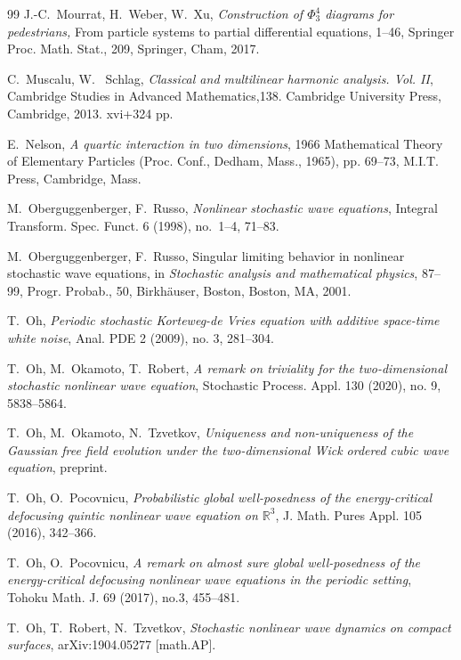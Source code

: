 \documentclass[%
11pt,  reqno]{amsart}
\newcommand{\1}{\hspace{0.2mm}\text{I}\hspace{0.2mm}}
\newcommand{\R}{\mathbb{R}}
\numberwithin{equation}{section}
\numberwithin{theorem}{section}
\begin{document}
\begin{thebibliography}{99}
J.-C.~Mourrat, H.~Weber, W.~Xu,
{\it Construction of $\Phi^4_3$ diagrams for pedestrians,}
 From particle systems to partial differential equations, 1--46, Springer Proc. Math. Stat., 209, Springer, Cham, 2017.

C.~Muscalu, W.~ Schlag,
 {\it Classical and multilinear harmonic analysis. {V}ol. {II}},
 Cambridge Studies in Advanced Mathematics,138. Cambridge University Press, Cambridge, 2013. 
xvi+324 pp. 


E.~Nelson, 
{\it A quartic interaction in two dimensions}, 
 1966 Mathematical Theory of Elementary Particles (Proc. Conf., Dedham, Mass., 1965), pp. 69--73, M.I.T. Press, Cambridge, Mass.






M.~Oberguggenberger, F.~Russo, 
{\it Nonlinear stochastic wave equations}, Integral Transform. Spec. Funct.  6 (1998), no.~1--4, 71--83. 


M.~Oberguggenberger, F.~Russo, Singular limiting behavior in nonlinear stochastic wave equations, in {\it Stochastic analysis and mathematical physics}, 87--99, Progr. Probab., 50, Birkh\"auser, Boston, 
 Boston, MA, 2001.




T.~Oh, {\it Periodic stochastic Korteweg-de Vries equation with additive space-time white noise}, Anal. PDE 2 (2009), no. 3, 281--304. 


T.~Oh, M.~Okamoto, T.~Robert,
 {\it A remark on triviality for the two-dimensional stochastic nonlinear wave equation}, 
 Stochastic Process. Appl. 130 (2020), no. 9, 5838--5864. 

T.~Oh, M.~Okamoto, N.~Tzvetkov,
{\it  Uniqueness and non-uniqueness of the Gaussian free field evolution under the two-dimensional Wick ordered cubic wave equation}, preprint.

T.~Oh, O.~Pocovnicu,
{\it  Probabilistic global well-posedness of the energy-critical defocusing quintic nonlinear wave equation on $\R^3$}, J. Math. Pures Appl. 105 (2016), 342--366. 




T.~Oh, O.~Pocovnicu,
{\it  A remark on almost sure global well-posedness of the energy-critical defocusing nonlinear wave equations in the periodic setting}, Tohoku Math. J. 69 (2017), no.3, 455--481. 


T.~Oh, T.~Robert, N.~Tzvetkov, 
 {\it Stochastic nonlinear wave dynamics on compact surfaces}, 
arXiv:1904.05277 [math.AP].


\end{thebibliography}
\end{document}
